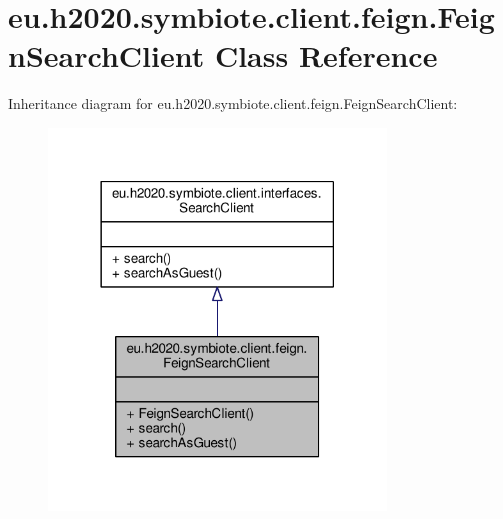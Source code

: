 \hypertarget{classeu_1_1h2020_1_1symbiote_1_1client_1_1feign_1_1FeignSearchClient}{}\section{eu.\+h2020.\+symbiote.\+client.\+feign.\+Feign\+Search\+Client Class Reference}
\label{classeu_1_1h2020_1_1symbiote_1_1client_1_1feign_1_1FeignSearchClient}


Inheritance diagram for eu.\+h2020.\+symbiote.\+client.\+feign.\+Feign\+Search\+Client\+:
\nopagebreak
\begin{figure}[H]
\begin{center}
\leavevmode
\includegraphics[width=254pt]{classeu_1_1h2020_1_1symbiote_1_1client_1_1feign_1_1FeignSearchClient__inherit__graph}
\end{center}
\end{figure}


